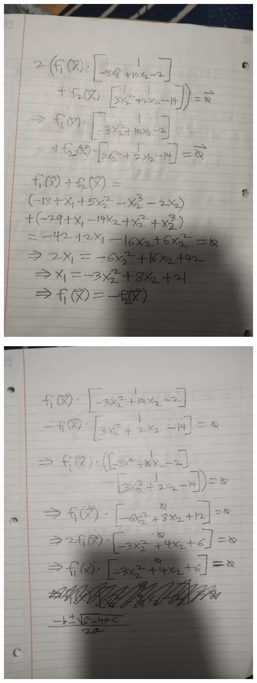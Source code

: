 \documentclass{article}
\begin{document}
\includegraphics[scale=0.1]{problem_5_2}

\includegraphics[scale=0.1]{problem_5_3}
\end{document}
